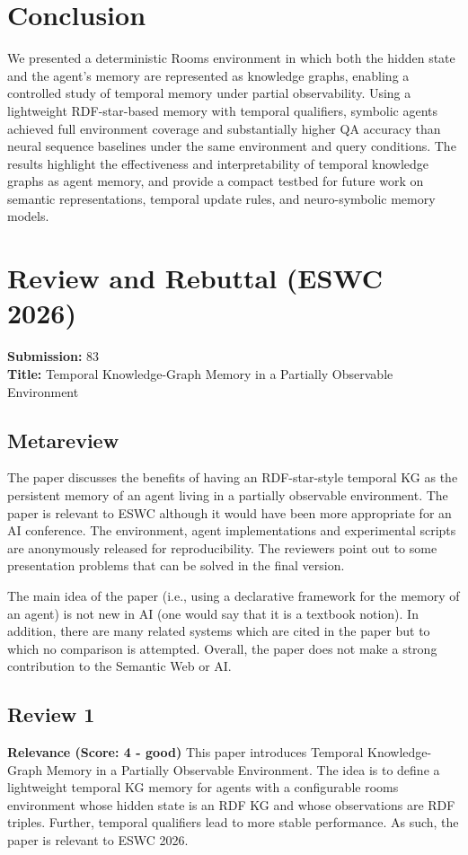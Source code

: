 \documentclass[runningheads]{llncs}
\begin{document}
\section{Conclusion}

We presented a deterministic Rooms environment in which both the hidden state and the agent’s memory are represented as knowledge graphs, enabling a controlled study of temporal memory under partial observability. Using a lightweight RDF-star-based memory with temporal qualifiers, symbolic agents achieved full environment coverage and substantially higher QA accuracy than neural sequence baselines under the same environment and query conditions. The results highlight the effectiveness and interpretability of temporal knowledge graphs as agent memory, and provide a compact testbed for future work on semantic representations, temporal update rules, and neuro-symbolic memory models.


\section*{Review and Rebuttal (ESWC 2026)}

\textbf{Submission:} 83\\
\textbf{Title:} Temporal Knowledge-Graph Memory in a Partially Observable Environment

\subsection*{Metareview}
The paper discusses the benefits of having an RDF-star-style temporal KG as the persistent memory of an agent living in a partially observable environment. The paper is relevant to ESWC although it would have been more appropriate for an AI conference. The environment, agent implementations and experimental scripts are anonymously released for reproducibility. The reviewers point out to some presentation problems that can be solved in the final version.

The main idea of the paper (i.e., using a declarative framework for the memory of an agent) is not new in AI (one would say that it is a textbook notion). In addition, there are many related systems which are cited in the paper but to which no comparison is attempted. Overall, the paper does not make a strong contribution to the Semantic Web or AI.

\subsection*{Review 1}
\textbf{Relevance (Score: 4 - good)} \quad This paper introduces Temporal Knowledge-Graph Memory in a Partially Observable Environment. The idea is to define a lightweight temporal KG memory for agents with a configurable rooms environment whose hidden state is an RDF KG and whose observations are RDF triples. Further, temporal qualifiers lead to more stable performance. As such, the paper is relevant to ESWC 2026.\\
\end{document}
